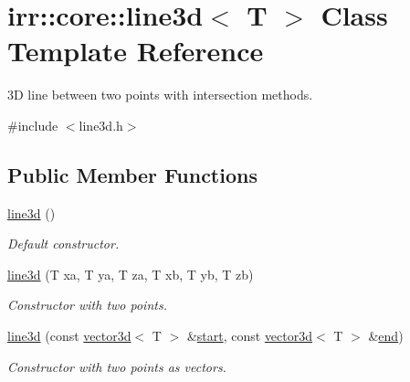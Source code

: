 \hypertarget{classirr_1_1core_1_1line3d}{}\section{irr\+:\+:core\+:\+:line3d$<$ T $>$ Class Template Reference}
\label{classirr_1_1core_1_1line3d}


3D line between two points with intersection methods.  




{\ttfamily \#include $<$line3d.\+h$>$}

\subsection*{Public Member Functions}
\begin{DoxyCompactItemize}
\item 
\hyperlink{classirr_1_1core_1_1line3d_ab88640572a102a9eebd1bf483b7d7e75}{line3d} ()
\begin{DoxyCompactList}\small\item\em Default constructor. \end{DoxyCompactList}\item 
\mbox{\label{classirr_1_1core_1_1line3d_a19bc6c5661d8913ac6911b2513f7804f}} 
\hyperlink{classirr_1_1core_1_1line3d_a19bc6c5661d8913ac6911b2513f7804f}{line3d} (T xa, T ya, T za, T xb, T yb, T zb)
\begin{DoxyCompactList}\small\item\em Constructor with two points. \end{DoxyCompactList}\item 
\mbox{\label{classirr_1_1core_1_1line3d_a9f77afda569d38afe68c9c3db39037f4}} 
\hyperlink{classirr_1_1core_1_1line3d_a9f77afda569d38afe68c9c3db39037f4}{line3d} (const \hyperlink{classirr_1_1core_1_1vector3d}{vector3d}$<$ T $>$ \&\hyperlink{classirr_1_1core_1_1line3d_a8874f77324b6ef6632e66b22051a3251}{start}, const \hyperlink{classirr_1_1core_1_1vector3d}{vector3d}$<$ T $>$ \&\hyperlink{classirr_1_1core_1_1line3d_aea19cb33971bb20e1d736facdae8a8f0}{end})
\begin{DoxyCompactList}\small\item\em Constructor with two points as vectors. \end{DoxyCompactList}\item 

\end{DoxyCompactItemize}
